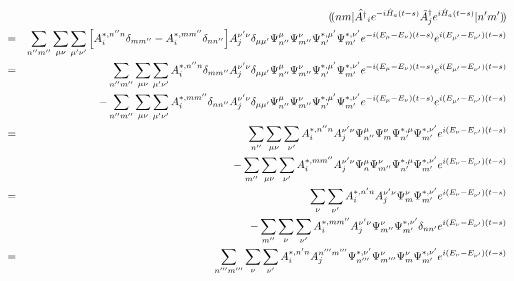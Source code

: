 \documentclass[10.5pt,a4paper]{jreport}
\newcommand{\dket}[1]{| #1 \rangle \! \rangle}
\newcommand{\dbra}[1]{\langle \! \langle #1 |}
\newcommand{\dpbra}[1]{( \! ( #1 |}
\newcommand{\dpket}[1]{| #1 ) \! )}
\begin{document}
\begin{eqnarray}
 \nonumber &&\dpbra{nm}\hat{A^\dagger}_ie^{-i\hat{H}_a(t-s)}\tilde{A}_j^\dagger e^{i\hat{H}_a(t-s)}\dpket{n'm'}\\
  \nonumber &=& \sum_{n''m''}\sum_{\mu\nu}\sum_{\mu'\nu'}\bqty{A_i^{*,  {n''n}}\delta_{mm''} - A_i^{*,  {mm''}}\delta_{nn''}}A_j^{ {\nu'\nu}}\delta_{ {\mu\mu'}}\Psi_{n''}^{\mu}\Psi_{m''}^{\nu}\Psi_{n'}^{*, \mu'}\Psi_{m'}^{*, \nu'}e^{-i(E_\mu - E_\nu)(t-s)}e^{i(E_{\mu'} - E_{\nu'})(t-s)}\\
  \nonumber &=&\sum_{n''m''}\sum_{\mu\nu}\sum_{\mu'\nu'}A_i^{*,  {n''n}}\delta_{mm''}A_j^{ {\nu'\nu}}\delta_{ {\mu\mu'}}\Psi_{n''}^{\mu}\Psi_{m''}^{\nu}\Psi_{n'}^{*, \mu'}\Psi_{m'}^{*, \nu'}e^{-i(E_\mu - E_\nu)(t-s)}e^{i(E_{\mu'} - E_{\nu'})(t-s)}\\
  &&- \sum_{n''m''}\sum_{\mu\nu}\sum_{\mu'\nu'}A_i^{*,  {mm''}}\delta_{nn''}A_j^{ {\nu'\nu}}\delta_{ {\mu\mu'}}\Psi_{n''}^{\mu}\Psi_{m''}^{\nu}\Psi_{n'}^{*, \mu'}\Psi_{m'}^{*, \nu'}e^{-i(E_\mu - E_\nu)(t-s)}e^{i(E_{\mu'} - E_{\nu'})(t-s)}\\
  \nonumber &=&\sum_{n''}\sum_{\mu\nu}\sum_{ {\nu'}}A_i^{*,  {n''n}}A_j^{ {\nu'\nu}}\Psi_{n''}^{\mu}\Psi_{m}^{\nu}\Psi_{n'}^{*, \mu}\Psi_{m'}^{*, \nu'}e^{ {i(E_\nu- E_{\nu'})(t-s)}}\\
  &&- \sum_{m''}\sum_{\mu\nu}\sum_{ {\nu'}}A_i^{*,  {mm''}}A_j^{ {\nu'\nu}}\Psi_{n}^{\mu}\Psi_{m''}^{\nu}\Psi_{n'}^{*, \mu}\Psi_{m'}^{*, \nu'}e^{ {i(E_\nu- E_{\nu'})(t-s)}}\\
  \nonumber &=&\sum_{ {\nu}}\sum_{ {\nu'}}A_i^{*,  {n'n}}A_j^{ {\nu'\nu}}\Psi_{m}^{\nu}\Psi_{m'}^{*, \nu'}e^{ {i(E_\nu- E_{\nu'})(t-s)}}\\
  &&- \sum_{ {m''}}\sum_{ {\nu}}\sum_{ {\nu'}}A_i^{*,  {mm''}}A_j^{ {\nu'\nu}}\Psi_{m''}^{\nu}\Psi_{m'}^{*, \nu'}\delta_{ {nn'}}e^{ {i(E_\nu- E_{\nu'})(t-s)}}\\
  \nonumber &=&\sum_{n'''m'''}\sum_{ {\nu}}\sum_{ {\nu'}}A_i^{*, {n'n}}A_j^{{n'''m'''}}\Psi_{n'''}^{ {*, \nu'}}\Psi_{m'''}^{ {\nu}}\Psi_{m}^{ {\nu}}\Psi_{m'}^{*, \nu'}e^{ {i(E_\nu- E_{\nu'})(t-s)}}\\

\end{eqnarray}
\end{document}
